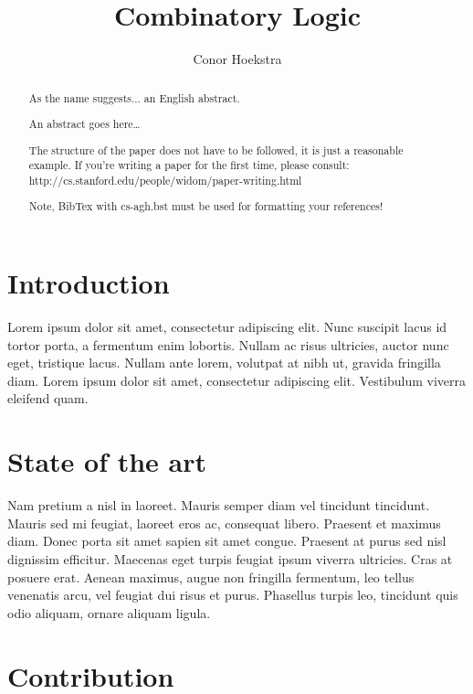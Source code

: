 \documentclass[10pt]{article}
\begin{document}
\begin{opening}

\title{Combinatory Logic}
\author[conorhoekstra@gmail.com, Toronto, ON, Canada]{Conor Hoekstra}

\begin{abstract}
  As the name suggests... an English abstract.
\end{abstract}

\begin{abstract}
An abstract goes here\ldots
	
The structure of the paper does not have to be followed, it is just
a reasonable example. If you're writing a paper for the first time, please consult:
http://cs.stanford.edu/people/widom/paper-writing.html

Note, BibTex with cs-agh.bst must be used for formatting your references!
\end{abstract}


\end{opening}

\section{Introduction}

Lorem ipsum dolor sit amet, consectetur adipiscing elit. Nunc suscipit lacus id tortor porta, a fermentum enim lobortis. Nullam ac risus ultricies, auctor nunc eget, tristique lacus. Nullam ante lorem, volutpat at nibh ut, gravida fringilla diam. Lorem ipsum dolor sit amet, consectetur adipiscing elit. Vestibulum viverra eleifend quam.

\section{State of the art}

Nam pretium a nisl in laoreet. Mauris semper diam vel tincidunt tincidunt. Mauris sed mi feugiat, laoreet eros ac, consequat libero. Praesent et maximus diam. Donec porta sit amet sapien sit amet congue. Praesent at purus sed nisl dignissim efficitur. Maecenas eget turpis feugiat ipsum viverra ultricies. Cras at posuere erat. Aenean maximus, augue non fringilla fermentum, leo tellus venenatis arcu, vel feugiat dui risus et purus. Phasellus turpis leo, tincidunt quis odio aliquam, ornare aliquam ligula. 

\section{Contribution}
\end{document}

